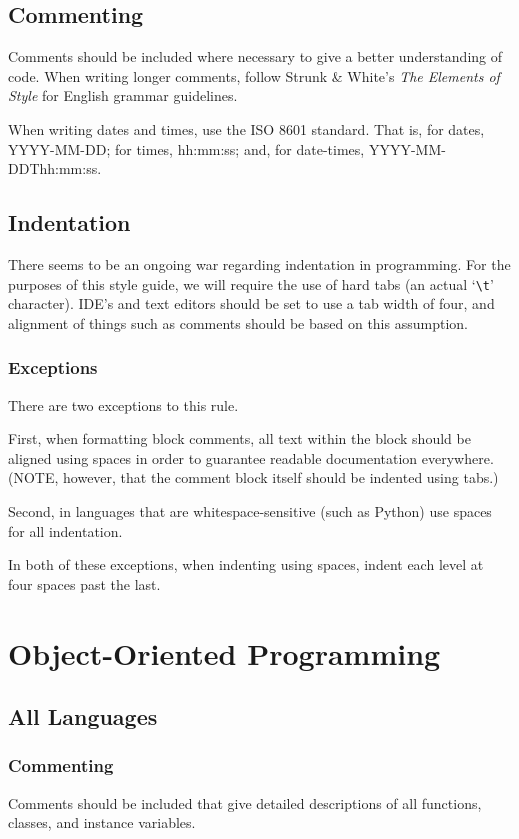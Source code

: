 \documentclass[12pt,letter]{memoir} %
\begin{document}
	\section{Commenting}
		Comments should be included where necessary to give a better
		understanding of code. When writing longer comments, follow Strunk \&
		White's \emph{The Elements of Style} for English grammar guidelines.

		When writing dates and times, use the ISO 8601 standard. That is, for
		dates, YYYY-MM-DD; for times, hh:mm:ss; and, for date-times,
		YYYY-MM-DDThh:mm:ss.

	\section{Indentation}
		There seems to be an ongoing war regarding indentation in programming.
		For the purposes of this style guide, we will require the use of hard
		tabs (an actual `\texttt{{\textbackslash}t}' character). IDE's and text
		editors should be set to use a tab width of four, and alignment of
		things such as comments should be based on this assumption.

		\subsection{Exceptions}
			There are two exceptions to this rule.

			First, when formatting block comments, all text within the block
			should be aligned using spaces in order to guarantee readable
			documentation everywhere. (NOTE, however, that the comment block
			itself should be indented using tabs.)

			Second, in languages that are whitespace-sensitive (such as Python)
			use spaces for all indentation.

			In both of these exceptions, when indenting using spaces, indent
			each level at four spaces past the last.

\chapter{Object-Oriented Programming}
	\section{All Languages}
		\subsection{Commenting}
			Comments should be included that give detailed descriptions of all
			functions, classes, and instance variables.
\end{document}

